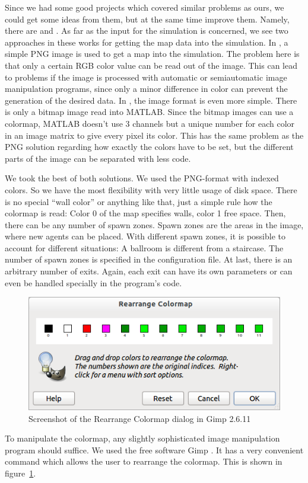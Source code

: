 \documentclass[11pt]{article}
\begin{document}
\label{sub:input}

Since we had some good projects which covered similar
problems as ours, we could get some ideas from them, but at the same time
improve them.  Namely, there are \cite{multilevel} and \cite{airplane}.  As far
as the input for the simulation is concerned, we see two approaches in these
works for getting the map data into the simulation.  In \cite{multilevel}, a
simple PNG image is used to get a map into the simulation. The problem here is
that only a certain RGB color value can be read out of the image.  This can
lead to problems if the image is processed with automatic or semiautomatic
image manipulation programs, since only a minor difference in color can prevent
the generation of the desired data.  In \cite{airplane}, the image format is
even more simple.  There is only a bitmap image read into MATLAB.  Since the
bitmap images can use a colormap, MATLAB doesn't use 3 channels but a unique
number for each color in an image matrix to give every pixel its color.  This
has the same problem as the PNG solution regarding how exactly the colors have
to be set, but the different parts of the image can be separated with less
code.

We took the best of both solutions. We used the PNG-format with indexed colors.
So we have the most flexibility with very little usage of disk space.  There is
no special ``wall color'' or anything like that, just a simple rule how the
colormap is read: Color 0 of the map specifies walls, color 1 free space.
Then, there can be any number of spawn zones.  Spawn zones are the areas in the
image, where new agents can be placed. With different spawn zones, it is
possible to account for different situations: A ballroom is different from a
staircase.  The number of spawn zones is specified in the configuration file.
At last, there is an arbitrary number of exits.  Again, each exit can have its
own parameters or can even be handled specially in the program's code. 

\begin{figure}[h]
	\centering
	\includegraphics[scale=0.5]{images/gimp.png}
	\caption{Screenshot of the Rearrange Colormap dialog in Gimp 2.6.11}
	\label{gimpscreenshot}
	
\end{figure}
To manipulate the colormap, any slightly sophisticated image manipulation
program should suffice. We used the free software Gimp \cite{gimp}. It has a
very convenient command which allows the user to rearrange the colormap. This
is shown in figure~\ref{gimpscreenshot}.
\end{document}
